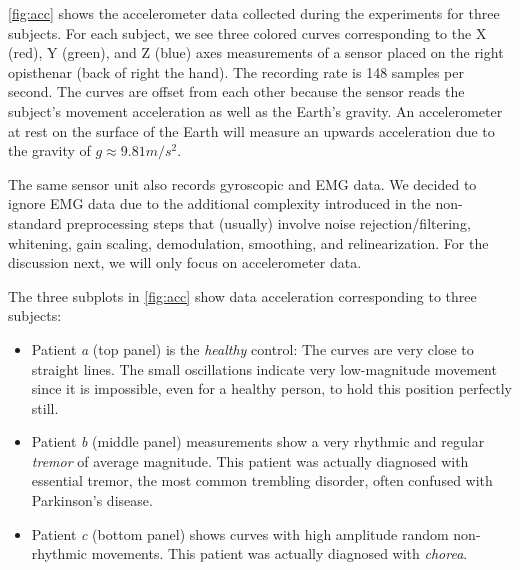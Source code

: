 \cref{fig:acc} shows the accelerometer data collected during the experiments for three subjects. For each subject, we see three colored curves corresponding to the X (red), Y (green), and Z (blue) axes measurements of a sensor placed on the right opisthenar (back of right the hand). The recording rate is 148 samples per second. The curves are offset from each other because the sensor reads the subject's movement acceleration as well as the Earth's gravity. An accelerometer at rest on the surface of the Earth will measure an upwards acceleration due to the gravity of $g \approx 9.81 m/s^2$. 

The same sensor unit also records gyroscopic and EMG data. We decided to ignore EMG data due to the additional complexity introduced in the non-standard preprocessing steps that (usually) involve noise rejection/filtering, whitening, gain scaling, demodulation, smoothing, and relinearization. For the  discussion next, we will only focus on accelerometer data.

The three subplots in \cref{fig:acc} show data acceleration corresponding to three subjects: 
\begin{itemize}
  \item Patient \textit{a} (top panel) is the \emph{healthy} control: The curves are very close to straight lines. The small oscillations indicate very low-magnitude movement since it is impossible, even for a healthy person, to hold this position perfectly still.
  \item Patient \textit{b} (middle panel) measurements show a very rhythmic and regular \emph{tremor} of average magnitude. This patient was actually diagnosed with essential tremor, the most common trembling disorder, often confused with Parkinson's disease.
  \item Patient \textit{c} (bottom panel) shows curves with high amplitude random non-rhythmic movements. This patient was actually diagnosed with \emph{chorea}. 
\end{itemize}
 

